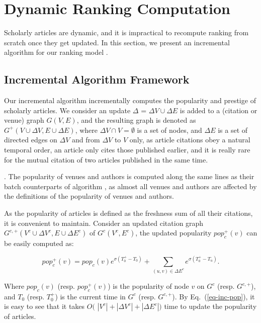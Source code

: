 \section{Dynamic Ranking Computation}
\label{sec-incAlg}

Scholarly articles are dynamic, and it is impractical to recompute ranking from scratch once they get updated. In this section, we present an incremental algorithm for our ranking model \ensemblerank.


\subsection{Incremental Algorithm Framework}
\label{subsec-inc-alg}




Our incremental algorithm \incensemble incrementally computes the popularity and prestige of scholarly articles.
We consider an update $\Delta$ = $\Delta V\cup\Delta E$ is added to a   (citation or venue) graph $G(V, E)$,
and the resulting graph is denoted as $G^+(V\cup\Delta V, E\cup\Delta E)$, where
$\Delta V\cap V = \emptyset$ is a set of nodes, and $\Delta E$ is a set of directed edges on $\Delta V$ and from $\Delta V$ to $V$ only, as article citations obey a natural temporal order, \ie an article only cites those published earlier, and it is really rare for the mutual citation of two articles published in the same time.


.
The popularity of venues and authors is computed along the same lines as their batch counterparts of algorithm \batensemble,
as almost all venues and authors are affected  by the definitions of the popularity of venues and authors.


As the popularity of articles is defined as the freshness sum of all their citations, it is convenient to maintain. Consider an updated citation graph $G^{c,+}(V^c\cup\Delta V^c, E\cup\Delta E^c)$ of $G^c(V^c, E^c)$,  the updated popularity $pop_{c}^+(v)$ can be easily computed as:
\begin{small}
\begin{equation}\label{eq-inc-pop}
pop_c^+(v) = pop_c(v) {e^{\sigma (T^+_0-T_0)}} + \sum_{(u,v)\in \Delta E^c} {e^{\sigma (T^+_0-T_u)}}.
\end{equation}
\end{small}
\noindent
Where $pop_c(v)$ (resp. $pop_c^+(v)$) is the popularity of node $v$ on $G^c$ (resp. $G^{c,+}$), and
 $T_0$ (resp. $T^+_0$) is the current time in $G^c$ (resp. $G^{c,+}$).
%
By Eq.~(\ref{eq-inc-pop}), it is easy to see that it takes $O($ $|V^c|+|\Delta V^c|+|\Delta E^c|)$ time to update the popularity of articles.



